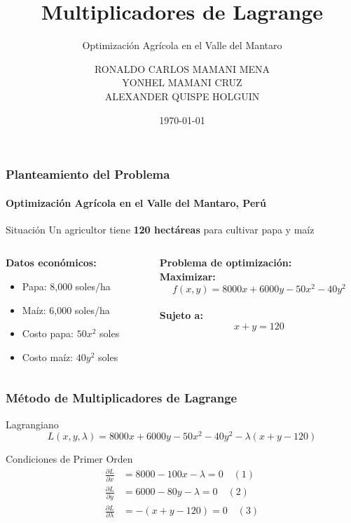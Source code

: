 \documentclass{beamer}
\title{Multiplicadores de Lagrange}
\subtitle{Optimización Agrícola en el Valle del Mantaro}
\author{RONALDO CARLOS MAMANI MENA\\ YONHEL MAMANI CRUZ\\ ALEXANDER QUISPE HOLGUIN}
\institute{Universidad Nacional Del Altiplano}
\date{\today}
\begin{document}
\frame{\titlepage}

\begin{frame}
\frametitle{Planteamiento del Problema}
\framesubtitle{Optimización Agrícola en el Valle del Mantaro, Perú}

\begin{block}{Situación}
Un agricultor tiene \textbf{120 hectáreas} para cultivar papa y maíz
\end{block}

\begin{columns}
\begin{column}{0.5\textwidth}
\textbf{Datos económicos:}
\begin{itemize}
\item Papa: 8,000 soles/ha
\item Maíz: 6,000 soles/ha
\item Costo papa: $50x^2$ soles
\item Costo maíz: $40y^2$ soles
\end{itemize}
\end{column}
\begin{column}{0.5\textwidth}
\textbf{Problema de optimización:}
\\[0.3cm]
\textbf{Maximizar:}
$$f(x,y) = 8000x + 6000y - 50x^2 - 40y^2$$
\\[0.2cm]
\textbf{Sujeto a:}
$$x + y = 120$$
\end{column}
\end{columns}

\end{frame}

\begin{frame}
\frametitle{Método de Multiplicadores de Lagrange}

\begin{block}{Lagrangiano}
$$L(x,y,\lambda) = 8000x + 6000y - 50x^2 - 40y^2 - \lambda(x + y - 120)$$
\end{block}

\begin{block}{Condiciones de Primer Orden}
\begin{align}
\frac{\partial L}{\partial x} &= 8000 - 100x - \lambda = 0 \quad (1)\\
\frac{\partial L}{\partial y} &= 6000 - 80y - \lambda = 0 \quad (2)\\
\frac{\partial L}{\partial \lambda} &= -(x + y - 120) = 0 \quad (3)
\end{align}
\end{block}

\end{frame}
\end{document}

